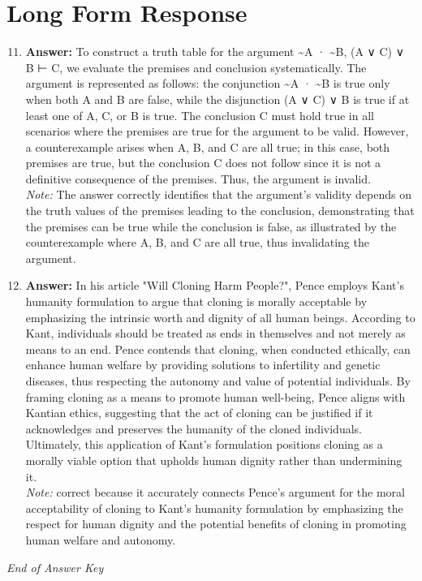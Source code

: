 \documentclass[12pt]{article}
\begin{document}
\section*{Long Form Response}
\begin{enumerate}[label=\arabic*.]
\setcounter{enumi}{10}
\item \textbf{Answer:} To construct a truth table for the argument \textasciitilde{}A · \textasciitilde{}B, (A ∨ C) ∨ B ⊢ C, we evaluate the premises and conclusion systematically. The argument is represented as follows: the conjunction \textasciitilde{}A · \textasciitilde{}B is true only when both A and B are false, while the disjunction (A ∨ C) ∨ B is true if at least one of A, C, or B is true. The conclusion C must hold true in all scenarios where the premises are true for the argument to be valid. However, a counterexample arises when A, B, and C are all true; in this case, both premises are true, but the conclusion C does not follow since it is not a definitive consequence of the premises. Thus, the argument is invalid.
\\ \textit{Note:} The answer correctly identifies that the argument's validity depends on the truth values of the premises leading to the conclusion, demonstrating that the premises can be true while the conclusion is false, as illustrated by the counterexample where A, B, and C are all true, thus invalidating the argument.
\item \textbf{Answer:} In his article "Will Cloning Harm People?", Pence employs Kant's humanity formulation to argue that cloning is morally acceptable by emphasizing the intrinsic worth and dignity of all human beings. According to Kant, individuals should be treated as ends in themselves and not merely as means to an end. Pence contends that cloning, when conducted ethically, can enhance human welfare by providing solutions to infertility and genetic diseases, thus respecting the autonomy and value of potential individuals. By framing cloning as a means to promote human well-being, Pence aligns with Kantian ethics, suggesting that the act of cloning can be justified if it acknowledges and preserves the humanity of the cloned individuals. Ultimately, this application of Kant's formulation positions cloning as a morally viable option that upholds human dignity rather than undermining it.
\\ \textit{Note:} correct because it accurately connects Pence's argument for the moral acceptability of cloning to Kant's humanity formulation by emphasizing the respect for human dignity and the potential benefits of cloning in promoting human welfare and autonomy.
\end{enumerate}

\vfill
\noindent\textit{End of Answer Key}
\end{document}
